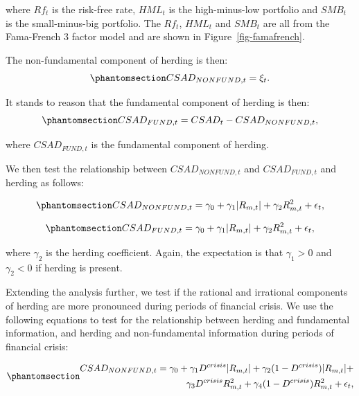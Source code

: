 \documentclass[
  letterpaper,
  DIV=11,
  numbers=noendperiod]{scrartcl}
\begin{document}
where \(Rf_t\) is the risk-free rate, \(HML_t\) is the high-minus-low
portfolio and \(SMB_t\) is the small-minus-big portfolio. The \(Rf_t\),
\(HML_t\) and \(SMB_t\) are all from the Fama-French 3 factor model
\citep[see][]{fama1993common} and are shown in
Figure~\ref{fig-famafrench}.

The non-fundamental component of herding is then:
\begin{equation}\phantomsection\label{eq-nonfunda}{
CSAD_{NONFUND, t} = \xi_t.
}\end{equation}

It stands to reason that the fundamental component of herding is then:
\begin{equation}\phantomsection\label{eq-funda}{
CSAD_{FUND, t} = CSAD_t - CSAD_{NONFUND, t},
}\end{equation}

where \(CSAD_{FUND, t}\) is the fundamental component of herding.

We then test the relationship between \(CSAD_{NONFUND, t}\) and
\(CSAD_{FUND, t}\) and herding as follows:

\begin{equation}\phantomsection\label{eq-nonfundaherd}{
CSAD_{NONFUND,t} = \gamma_0 +  \gamma_1|R_{m, t}| +  \gamma_2R_{m, t}^2 + \epsilon_{t},
}\end{equation}

\begin{equation}\phantomsection\label{eq-fundaherd}{
CSAD_{FUND,t} = \gamma_0 +  \gamma_1|R_{m, t}| +  \gamma_2R_{m, t}^2 + \epsilon_{t},
}\end{equation}

where \(\gamma_2\) is the herding coefficient. Again, the expectation is
that \(\gamma_1 > 0\) and \(\gamma_2 < 0\) if herding is present.

Extending the analysis further, we test if the rational and irrational
components of herding are more pronounced during periods of financial
crisis. We use the following equations to test for the relationship
between herding and fundamental information, and herding and
non-fundamental information during periods of financial crisis:

\begin{equation}\phantomsection\label{eq-nonfundacrisis}{
\begin{aligned}
CSAD_{NONFUND, t} = \gamma_0 +  \gamma_1D^{crisis}|R_{m, t}| + \gamma_2(1 - D^{crisis})|R_{m,t}|  + \\  
\gamma_3D^{crisis}R_{m, t}^2 + \gamma_4(1-D^{crisis})R_{m,t}^2 + \epsilon_{t},
\end{aligned}
}\end{equation}
\end{document}
